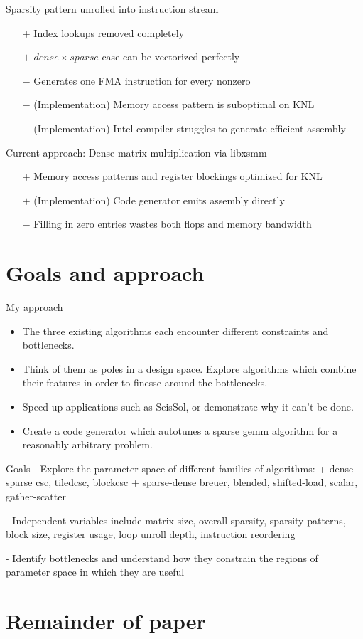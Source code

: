   Sparsity pattern unrolled into instruction stream
    \begin{itemize}
    \item[$+$] Index lookups removed completely
    \item[$+$] $dense \times sparse$ case can be vectorized perfectly 
    \item[$-$] Generates one FMA instruction for every nonzero
    \item[$-$] (Implementation) Memory access pattern is suboptimal on KNL
    \item[$-$] (Implementation) Intel compiler struggles to generate efficient assembly
    \end{itemize}

  Current approach: Dense matrix multiplication via libxsmm
    \begin{itemize}
    \item[$+$] Memory access patterns and register blockings optimized for KNL
    \item[$+$] (Implementation) Code generator emits assembly directly 
    \item[$-$] Filling in zero entries wastes both flops and memory bandwidth
    \end{itemize}


  \section{Goals and approach}
  My approach
    \begin{itemize}
    \item The three existing algorithms each encounter different constraints and bottlenecks.
    \item Think of them as poles in a design space. Explore algorithms which combine their features in order to finesse around the bottlenecks.
    \item Speed up applications such as SeisSol, or demonstrate why it can't be done.
    \item Create a code generator which autotunes a sparse gemm algorithm for a reasonably arbitrary problem.
    \end{itemize}

 Goals
   - Explore the parameter space of different families of algorithms:
     + dense-sparse csc, tiledcsc, blockcsc
     + sparse-dense breuer, blended, shifted-load, scalar, gather-scatter

   - Independent variables include matrix size, overall sparsity, sparsity patterns, block size, register usage, loop unroll depth, instruction reordering

   - Identify bottlenecks and understand how they constrain the regions of parameter space in which they are useful

   
    \section{Remainder of paper}


